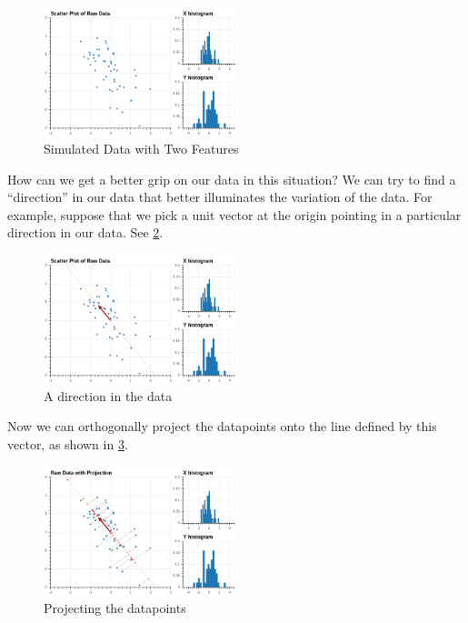 \documentclass[
  oneside]{scrbook}
\begin{document}
\begin{figure}
\hypertarget{fig:pcasimfig}{%
\centering
\includegraphics[width=0.5\textwidth,height=\textheight]{img/PCAsimulated-1.png}
\caption{Simulated Data with Two Features}\label{fig:pcasimfig}
}
\end{figure}

How can we get a better grip on our data in this situation? We can try
to find a ``direction'' in our data that better illuminates the
variation of the data. For example, suppose that we pick a unit vector
at the origin pointing in a particular direction in our data. See
\cref{fig:pcasimfig-1}.

\begin{figure}
\hypertarget{fig:pcasimfig-1}{%
\centering
\includegraphics[width=0.5\textwidth,height=\textheight]{img/PCAsimulated-2.png}
\caption{A direction in the data}\label{fig:pcasimfig-1}
}
\end{figure}

Now we can orthogonally project the datapoints onto the line defined by
this vector, as shown in \cref{fig:pcasimfig-2}.

\begin{figure}
\hypertarget{fig:pcasimfig-2}{%
\centering
\includegraphics[width=0.5\textwidth,height=\textheight]{img/PCAsimulated-3.png}
\caption{Projecting the datapoints}\label{fig:pcasimfig-2}
}
\end{figure}
\end{document}
